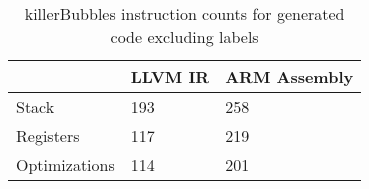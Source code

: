 \begin{table}[h!]
\centering
\begin{tabular}{p{}p{}p{}}
  \hline
 & LLVM IR & ARM Assembly \\ 
  \hline
Stack & 193 & 258 \\ 
  Registers & 117 & 219 \\ 
  Optimizations & 114 & 201 \\ 
   \hline
\end{tabular}
\caption{killerBubbles instruction counts for generated code excluding labels}
\end{table}
